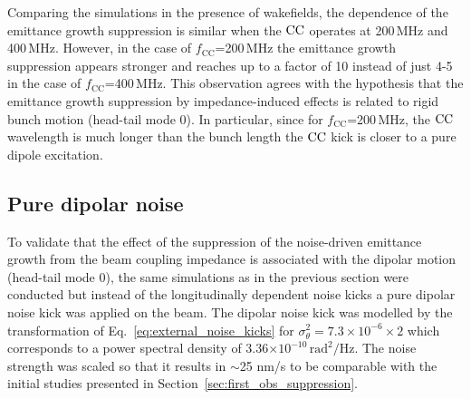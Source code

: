  Comparing the simulations in the presence of wakefields, the dependence of the emittance growth suppression is similar when the ${\mathrm{CC}}$ operates at 200\,MHz and 400\,MHz. However, in the case of $f_\mathrm{CC}$=200\,MHz the emittance growth suppression appears stronger and reaches up to a factor of 10 instead of just 4-5 in the case of $f_\mathrm{CC}$=400\,MHz. This observation agrees with the hypothesis that the emittance growth suppression by impedance-induced effects is related to rigid bunch motion (head-tail mode 0). In particular, since for $f_\mathrm{CC}$=200\,MHz, the ${\mathrm{CC}}$ wavelength is much longer than the bunch length the ${\mathrm{CC}}$ kick is closer to a pure dipole excitation. 
 
 
 
 




\subsection{Pure dipolar noise}\label{subsec:dipole_noise}
To validate that the effect of the suppression of the noise-driven emittance growth from the beam coupling impedance is associated with the dipolar motion (head-tail mode 0), the same simulations as in the previous section were conducted but instead of the longitudinally dependent noise kicks a pure dipolar noise kick was applied on the beam. The dipolar noise kick was modelled by the transformation of Eq.~\eqref{eq:external_noise_kicks} for $\sigma_\theta^2=7.3\times 10^{-6} \times 2$ which corresponds to a power spectral density of 3.36$\times 10^{-10}$\,$\mathrm{rad^2/Hz}$. The noise strength was scaled so that it results in $\sim$25 nm/s to be comparable with the initial studies presented in Section~\ref{sec:first_obs_suppression}.

